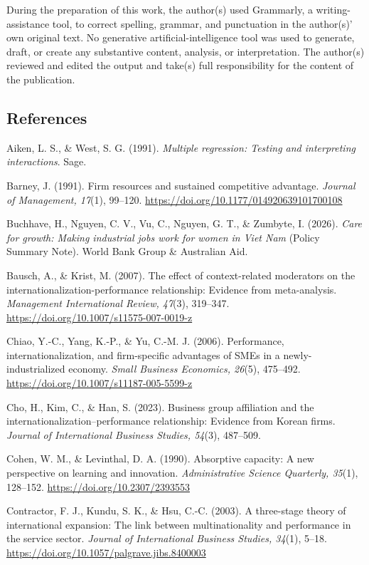 \documentclass[
  12pt,a4paper]{article}
\begin{document}
During the preparation of this work, the author(s) used Grammarly, a
writing-assistance tool, to correct spelling, grammar, and punctuation
in the author(s)' own original text. No generative
artificial-intelligence tool was used to generate, draft, or create any
substantive content, analysis, or interpretation. The author(s) reviewed
and edited the output and take(s) full responsibility for the content of
the publication.

\hypertarget{references}{%
\subsection{References}\label{references}}

Aiken, L. S., \& West, S. G. (1991). \emph{Multiple regression: Testing
and interpreting interactions}. Sage.

Barney, J. (1991). Firm resources and sustained competitive advantage.
\emph{Journal of Management, 17}(1), 99--120.
\url{https://doi.org/10.1177/014920639101700108}

Buchhave, H., Nguyen, C. V., Vu, C., Nguyen, G. T., \& Zumbyte, I.
(2026). \emph{Care for growth: Making industrial jobs work for women in
Viet Nam} (Policy Summary Note). World Bank Group \& Australian Aid.

Bausch, A., \& Krist, M. (2007). The effect of context-related
moderators on the internationalization-performance relationship:
Evidence from meta-analysis. \emph{Management International Review,
47}(3), 319--347. \url{https://doi.org/10.1007/s11575-007-0019-z}

Chiao, Y.-C., Yang, K.-P., \& Yu, C.-M. J. (2006). Performance,
internationalization, and firm-specific advantages of SMEs in a
newly-industrialized economy. \emph{Small Business Economics, 26}(5),
475--492. \url{https://doi.org/10.1007/s11187-005-5599-z}

Cho, H., Kim, C., \& Han, S. (2023). Business group affiliation and the
internationalization--performance relationship: Evidence from Korean
firms. \emph{Journal of International Business Studies, 54}(3),
487--509.

Cohen, W. M., \& Levinthal, D. A. (1990). Absorptive capacity: A new
perspective on learning and innovation. \emph{Administrative Science
Quarterly, 35}(1), 128--152. \url{https://doi.org/10.2307/2393553}

Contractor, F. J., Kundu, S. K., \& Hsu, C.-C. (2003). A three-stage
theory of international expansion: The link between multinationality and
performance in the service sector. \emph{Journal of International
Business Studies, 34}(1), 5--18.
\url{https://doi.org/10.1057/palgrave.jibs.8400003}
\end{document}

